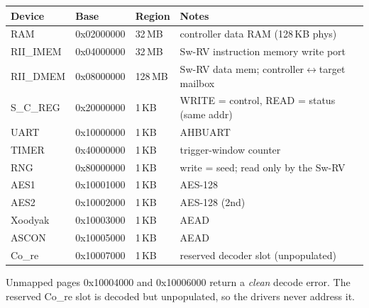 \documentclass[11pt,a4paper]{report}
\newcommand{\code}[1]{{\ttfamily\small #1}}
\begin{document}
\begin{center}
\end{center}

\begin{center}
\begin{longtable}{lll p{6.4cm}}
\toprule
Device & Base & Region & Notes \\ \midrule\endhead
RAM & \code{0x02000000} & 32\,MB & controller data RAM (128\,KB phys) \\
RII\_IMEM & \code{0x04000000} & 32\,MB & Sw-RV instruction memory write port \\
RII\_DMEM & \code{0x08000000} & 128\,MB & Sw-RV data mem; controller$\leftrightarrow$target mailbox \\
S\_C\_REG & \code{0x20000000} & 1\,KB & WRITE = control, READ = status (same addr) \\
UART & \code{0x10000000} & 1\,KB & AHBUART \\
TIMER & \code{0x40000000} & 1\,KB & trigger-window counter \\
RNG & \code{0x80000000} & 1\,KB & write = seed; read only by the Sw-RV \\
AES1 & \code{0x10001000} & 1\,KB & AES-128 \\
AES2 & \code{0x10002000} & 1\,KB & AES-128 (2nd) \\
Xoodyak & \code{0x10003000} & 1\,KB & AEAD \\
ASCON & \code{0x10005000} & 1\,KB & AEAD \\
Co\_re & \code{0x10007000} & 1\,KB & reserved decoder slot (unpopulated) \\
\bottomrule
\end{longtable}\end{center}
Unmapped pages \code{0x10004000} and \code{0x10006000} return a \emph{clean} decode
error. The reserved \code{Co\_re} slot is decoded but unpopulated, so the drivers
never address it.
\end{document}
